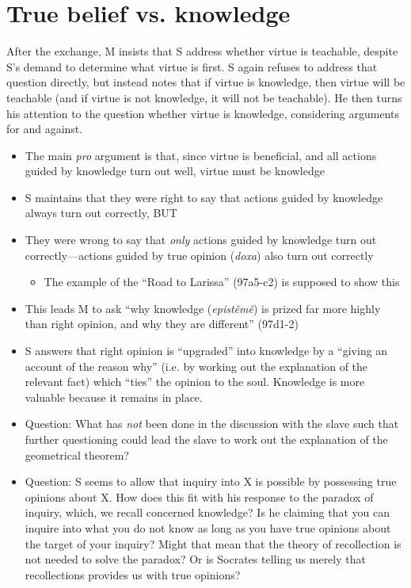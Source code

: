 \documentclass[10 pt]{article}
\begin{document}
\section*{True belief vs. knowledge}

After the exchange, M insists that S address whether virtue is teachable, despite S's demand to determine what virtue is first. S again refuses to address that question directly, but instead notes that if virtue is knowledge, then virtue will be teachable (and if virtue is not knowledge, it will not be teachable). He then turns his attention to the question whether virtue is knowledge, considering arguments for and against.
\begin{itemize}\item{The main \emph{pro} argument is that, since virtue is beneficial, and all actions guided by knowledge turn out well, virtue must be knowledge}
\item S maintains that they were right to say that actions guided by knowledge always turn out correctly, BUT
\item They were wrong to say that \emph{only} actions guided by knowledge turn out correctly---actions guided by true opinion (\emph{doxa}) also turn out correctly

\begin{itemize}\item{The example of the ``Road to Larissa'' (97a5-c2) is supposed to show this}\end{itemize}

\item This leads M to ask ``why knowledge (\emph{epist\^{e}m\^{e}}) is prized far more highly than right opinion, and why they are different'' (97d1-2)

\item S answers that right opinion is ``upgraded'' into knowledge by a ``giving an account of the reason why'' (i.e. by working out the explanation of the relevant fact) which ``ties'' the opinion to the soul. Knowledge is more valuable because it remains in place.

\item Question: What has \emph{not} been done in the discussion with the slave such that further questioning could lead the slave to work out the explanation of the geometrical theorem?

\item Question: S seems to allow that inquiry into X is possible by possessing true opinions about X. How does this fit with his response to the paradox of inquiry, which, we recall concerned knowledge? Is he claiming that you can inquire into what you do not know as long as you have true opinions about the target of your inquiry? Might that mean that the theory of recollection is not needed to solve the paradox? Or is Socrates telling us merely that recollections provides us with true opinions?
\end{itemize}
\end{document}
